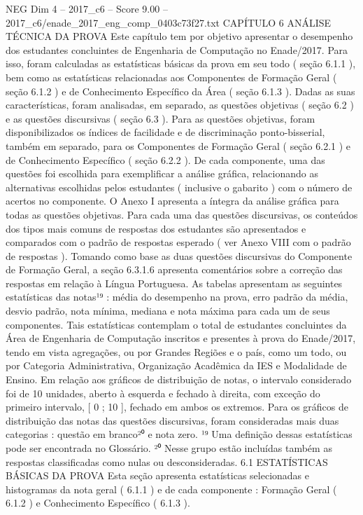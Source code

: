 \begin{textsample}{NEG Dim 4 – 2017\_c6 – Score 9.00 – 2017\_c6/enade\_2017\_eng\_comp\_0403c73f27.txt}  \label{ex:f4_neg_320}
CAPÍTULO 6 ANÁLISE TÉCNICA DA PROVA Este capítulo tem por objetivo apresentar o desempenho dos estudantes concluintes de Engenharia de Computação no Enade/2017.
Para isso, foram calculadas as estatísticas básicas da prova em seu todo ( seção 6.1.1 ), bem como as estatísticas relacionadas aos Componentes de Formação Geral ( seção 6.1.2 ) e de Conhecimento Específico da Área ( seção 6.1.3 ).
Dadas as suas características, foram analisadas, em separado, as questões objetivas ( seção 6.2 ) e as questões discursivas ( seção 6.3 ).
Para as questões objetivas, foram disponibilizados os índices de facilidade e de discriminação ponto-bisserial, também em separado, para os Componentes de Formação Geral ( seção 6.2.1 ) e de Conhecimento Específico ( seção 6.2.2 ).
De cada componente, uma das questões foi escolhida para exemplificar a análise gráfica, relacionando as alternativas escolhidas pelos estudantes ( inclusive o gabarito ) com o número de acertos no componente.
O Anexo I apresenta a íntegra da análise gráfica para todas as questões objetivas.
Para cada uma das questões discursivas, os conteúdos dos tipos mais comuns de respostas dos estudantes são apresentados e comparados com o padrão de respostas esperado ( ver Anexo VIII com o padrão de respostas ).
Tomando como base as duas questões discursivas do Componente de Formação Geral, a seção 6.3.1.6 apresenta comentários sobre a correção das respostas em relação à Língua Portuguesa.
As tabelas apresentam as seguintes estatísticas das notas¹⁹ : média do desempenho na prova, erro padrão da média, desvio padrão, nota mínima, mediana e nota máxima para cada um de seus componentes.
Tais estatísticas contemplam o total de estudantes concluintes da Área de Engenharia de Computação inscritos e presentes à prova do Enade/2017, tendo em vista agregações, ou por Grandes Regiões e o país, como um todo, ou por Categoria Administrativa, Organização Acadêmica da IES e Modalidade de Ensino.
Em relação aos gráficos de distribuição de notas, o intervalo considerado foi de 10 unidades, aberto à esquerda e fechado à direita, com exceção do primeiro intervalo, [ 0 ; 10 ], fechado em ambos os extremos.
Para os gráficos de distribuição das notas das questões discursivas, foram consideradas mais duas categorias : questão em branco²⁰ e nota zero. ¹⁹ Uma definição dessas estatísticas pode ser encontrada no Glossário. ²⁰ Nesse grupo estão incluídas também as respostas classificadas como nulas ou desconsideradas. 6.1 ESTATÍSTICAS BÁSICAS DA PROVA Esta seção apresenta estatísticas selecionadas e histogramas da nota geral ( 6.1.1 ) e de cada componente : Formação Geral ( 6.1.2 ) e Conhecimento Específico ( 6.1.3 ).

\end{textsample}
